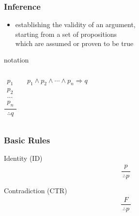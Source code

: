 \documentclass[dvipsnames]{beamer}
\begin{document}
\begin{frame}
  \frametitle{Inference}

  \begin{itemize}
    \item establishing the validity of an argument,\\
      starting from a set of propositions\\
      which are assumed or proven to be true
  \end{itemize}

  \pause
  \begin{block}{notation}
    \begin{columns}
      \[
      \frac
        {
          \begin{array}{c}
            p_1\\
            p_2\\
            \dots\\
            p_n
          \end{array}
        }
        {
          \therefore q
        }
      \]

      $p_1 \wedge p_2 \wedge \cdots \wedge p_n \Rightarrow q$
    \end{columns}
  \end{block}
\end{frame}

\begin{frame}
  \frametitle{Basic Rules}

  \begin{block}{Identity (ID)}
    \[
    \frac
      {
        \begin{array}{c}
          p
        \end{array}
      }
      {
        \therefore p
      }
    \]
  \end{block}

  \pause
  \begin{block}{Contradiction (CTR)}
  \[
  \frac
    {
      \begin{array}{c}
        F
      \end{array}
    }
    {
      \therefore p
    }
  \]
  \end{block}
\end{frame}
\end{document}
